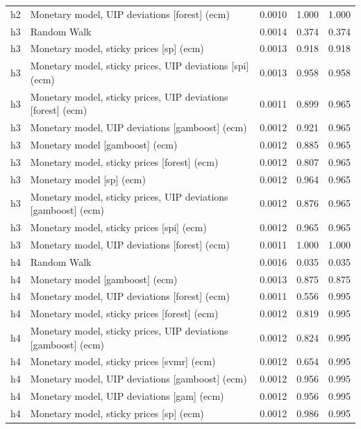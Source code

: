 \begin{ThreePartTable}
\begin{longtable}[t]{cp{5.5cm}ccc}
h2 & \raggedright Monetary model, UIP deviations [forest] (ecm) & 0.0010 & 1.000 & 1.000\\
\addlinespace
h3 & \raggedright Random Walk & 0.0014 & 0.374 & 0.374\\
h3 & \raggedright Monetary model, sticky prices [sp] (ecm) & 0.0013 & 0.918 & 0.918\\
h3 & \raggedright Monetary model, sticky prices, UIP deviations [spi] (ecm) & 0.0013 & 0.958 & 0.958\\
h3 & \raggedright Monetary model, sticky prices, UIP deviations [forest] (ecm) & 0.0011 & 0.899 & 0.965\\
h3 & \raggedright Monetary model, UIP deviations [gamboost] (ecm) & 0.0012 & 0.921 & 0.965\\
h3 & \raggedright Monetary model [gamboost] (ecm) & 0.0012 & 0.885 & 0.965\\
h3 & \raggedright Monetary model, sticky prices [forest] (ecm) & 0.0012 & 0.807 & 0.965\\
h3 & \raggedright Monetary model [sp] (ecm) & 0.0012 & 0.964 & 0.965\\
h3 & \raggedright Monetary model, sticky prices, UIP deviations [gamboost] (ecm) & 0.0012 & 0.876 & 0.965\\
h3 & \raggedright Monetary model, sticky prices [spi] (ecm) & 0.0012 & 0.965 & 0.965\\
h3 & \raggedright Monetary model, UIP deviations [forest] (ecm) & 0.0011 & 1.000 & 1.000\\
\addlinespace
h4 & \raggedright Random Walk & 0.0016 & 0.035 & 0.035\\
h4 & \raggedright Monetary model [gamboost] (ecm) & 0.0013 & 0.875 & 0.875\\
h4 & \raggedright Monetary model, UIP deviations [forest] (ecm) & 0.0011 & 0.556 & 0.995\\
h4 & \raggedright Monetary model, sticky prices [forest] (ecm) & 0.0012 & 0.819 & 0.995\\
h4 & \raggedright Monetary model, sticky prices, UIP deviations [gamboost] (ecm) & 0.0012 & 0.824 & 0.995\\
h4 & \raggedright Monetary model, sticky prices [svmr] (ecm) & 0.0012 & 0.654 & 0.995\\
h4 & \raggedright Monetary model, UIP deviations [gamboost] (ecm) & 0.0012 & 0.956 & 0.995\\
h4 & \raggedright Monetary model, UIP deviations [gam] (ecm) & 0.0012 & 0.956 & 0.995\\
h4 & \raggedright Monetary model, sticky prices [sp] (ecm) & 0.0012 & 0.986 & 0.995\\

\end{longtable}
\end{ThreePartTable}
